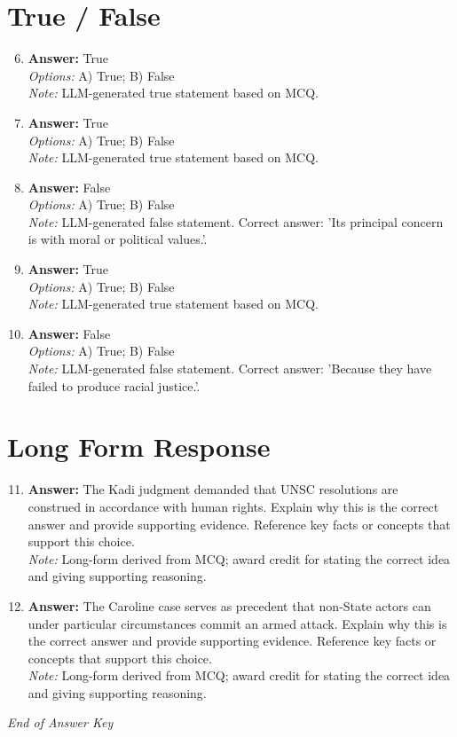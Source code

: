 \documentclass[12pt]{article}
\begin{document}
\section*{True / False}
\begin{enumerate}[label=\arabic*.]
\setcounter{enumi}{5}
\item \textbf{Answer:} True
\\ \textit{Options:} A) True; B) False
\\ \textit{Note:} LLM-generated true statement based on MCQ.
\item \textbf{Answer:} True
\\ \textit{Options:} A) True; B) False
\\ \textit{Note:} LLM-generated true statement based on MCQ.
\item \textbf{Answer:} False
\\ \textit{Options:} A) True; B) False
\\ \textit{Note:} LLM-generated false statement. Correct answer: 'Its principal concern is with moral or political values.'.
\item \textbf{Answer:} True
\\ \textit{Options:} A) True; B) False
\\ \textit{Note:} LLM-generated true statement based on MCQ.
\item \textbf{Answer:} False
\\ \textit{Options:} A) True; B) False
\\ \textit{Note:} LLM-generated false statement. Correct answer: 'Because they have failed to produce racial justice.'.
\end{enumerate}

\section*{Long Form Response}
\begin{enumerate}[label=\arabic*.]
\setcounter{enumi}{10}
\item \textbf{Answer:} The Kadi judgment demanded that UNSC resolutions are construed in accordance with human rights. Explain why this is the correct answer and provide supporting evidence. Reference key facts or concepts that support this choice.
\\ \textit{Note:} Long-form derived from MCQ; award credit for stating the correct idea and giving supporting reasoning.
\item \textbf{Answer:} The Caroline case serves as precedent that non-State actors can under particular circumstances commit an armed attack. Explain why this is the correct answer and provide supporting evidence. Reference key facts or concepts that support this choice.
\\ \textit{Note:} Long-form derived from MCQ; award credit for stating the correct idea and giving supporting reasoning.
\end{enumerate}

\vfill
\noindent\textit{End of Answer Key}
\end{document}
